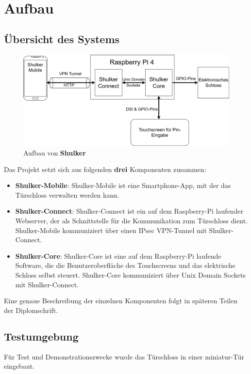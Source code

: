 \chapter{Aufbau}

\section{Übersicht des Systems}


\begin{figure}[H]
	\begin{center}
		\includegraphics[width=1\textwidth]{images/Intro/Leitbild.png}
		\caption{Aufbau von \textbf{Shulker}}
	\end{center}
\end{figure}

Das Projekt setzt sich aus folgenden \textbf{drei} Komponenten zusammen:


\begin{itemize}
    \item \textbf{Shulker-Mobile}: Shulker-Mobile ist eine Smartphone-App, mit der das Türschloss verwalten werden kann.
    \item \textbf{Shulker-Connect}: Shulker-Connect ist ein auf dem Raspberry-Pi laufender Webserver, der als Schnittstelle für die Kommunikation zum Türschloss dient. Shulker-Mobile kommuniziert über einen IPsec VPN-Tunnel mit Shulker-Connect.
    \item \textbf{Shulker-Core}: Shulker-Core ist eine auf dem Raspberry-Pi laufende Software, die die Benutzeroberfläche des Touchscreens und das elektrische Schloss selbst steuert. Shulker-Core kommuniziert über Unix Domain Sockets mit Shulker-Connect.
\end{itemize}

Eine genaue Beschreibung der einzelnen Komponenten folgt in späteren Teilen der Diplomschrift. 

\section{Testumgebung}

Für Test und Demonstrationszwecke wurde das Türschloss in einer miniatur-Tür eingebaut. 
